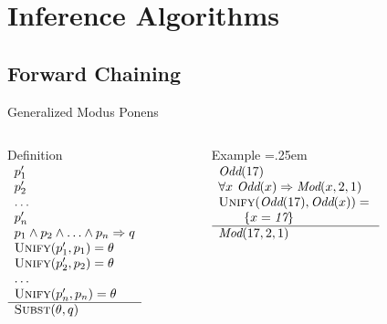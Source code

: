 \documentclass[12pt]{beamer}
\newcommand{\SC}[1]{\mbox{\sc#1}}
\newcommand{\EM}[1]{\mbox{\em#1}}
\newcommand{\tab}{\hspace{1em}}
\newcommand{\limpl}{\Rightarrow}
\begin{document}
\section{Inference Algorithms}
\subsection{Forward Chaining}
\begin{frame}{Generalized Modus Ponens}
	\begin{columns}[T]
		\begin{column}{1.8in}
			\begin{block}{Definition}
				$
				\begin{array}{l}
				p_1' \\
				p_2' \\
				\ldots \\
				p_n' \\
				p_1 \land p_2 \land \ldots \land p_n \limpl q \\
				\SC{Unify}(p_1', p_1) = \theta \\
				\SC{Unify}(p_2', p_2) = \theta \\
				\ldots \\
				\SC{Unify}(p_n', p_n) = \theta \\
				\hline
				\SC{Subst}(\theta, q)
				\end{array}
				$
			\end{block}
		\end{column}
		\pause
		\begin{column}{2.4in}
			\begin{block}{Example}
				\extrarowheight=.25em
				$
				\begin{array}{l}
				\EM{Odd}(17) \\
				\forall x\ \EM{Odd}(x) \limpl \EM{Mod}(x, 2, 1) \\
				\SC{Unify}(\EM{Odd}(17), \EM{Odd}(x)) = \mbox{}\\
				\tab\tab \{x = \EM{17}\} \\
				\hline
				\EM{Mod}(17, 2, 1)
				\end{array}
				$
			\end{block}
		\end{column}
	\end{columns}
\end{frame}
\end{document}
